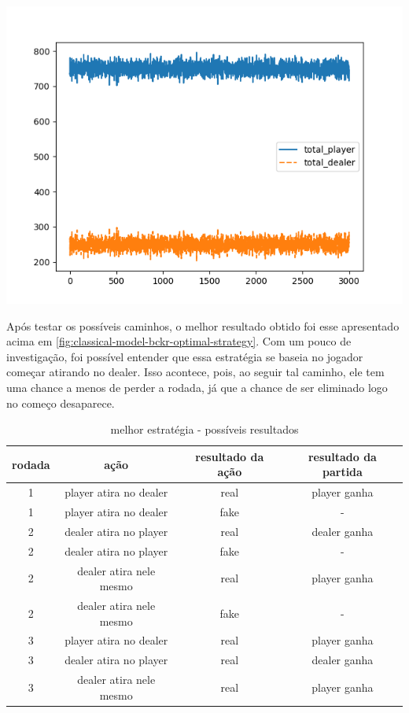 \documentclass{article}
\begin{document}
\begin{center}
	\includegraphics[scale=0.6]{optimal_player_strategy.png}
	\label{fig:classical-model-bckr-optimal-strategy}
\end{center}

Após testar os possíveis caminhos, o melhor resultado obtido foi esse apresentado acima em \ref{fig:classical-model-bckr-optimal-strategy}. Com um pouco de investigação, foi possível entender que essa estratégia se baseia no jogador começar atirando no dealer. Isso acontece, pois, ao seguir tal caminho, ele tem uma chance a menos de perder a rodada, já que a chance de ser eliminado logo no começo desaparece.

\begin{table}[!h]
	\begin{center}
		\begin{tabular}{ |c|c|c|c| } 
			\hline
			rodada & ação & resultado da ação & resultado da partida \\
			\hline
			1 & player atira no dealer  & real & player ganha\\
			\hline
			1 & player atira no dealer  & fake & -\\
			\hline
			2 & dealer atira no player  & real & dealer ganha\\
			\hline
			2 & dealer atira no player  & fake & -\\
			\hline
			2 & dealer atira nele mesmo  & real & player ganha\\
			\hline
			2 & dealer atira nele mesmo  & fake & -\\
			\hline
			3 & player atira no dealer  & real & player ganha\\
			\hline
			3 & dealer atira no player & real & dealer ganha\\
			\hline
			3 & dealer atira nele mesmo  & real & player ganha\\
			\hline
		\end{tabular}
		\caption{melhor estratégia - possíveis resultados}
	\end{center}
\end{table}
\end{document}
